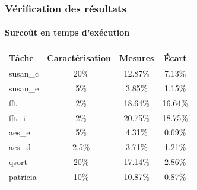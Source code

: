 
\begin{frame}
\frametitle{Vérification des résultats}
\framesubtitle{Surcoût en temps d'exécution}
\begin{center}
\begin{tabular}{l|c|c||c}
Tâche & Caractérisation & Mesures & \'Ecart\\
\hline
susan\_c & ~20\% & 12.87\% & 7.13\%\\
susan\_e & ~5\%  & 3.85\%  & 1.15\%\\
fft      & ~2\%  & 18.64\% & 16.64\%\\
fft\_i   & ~2\%  & 20.75\% & 18.75\%\\
aes\_e   & ~5\%  & 4.31\%  & 0.69\%\\
aes\_d   & ~2.5\%& 3.71\%  & 1.21\%\\
qsort    & ~20\% & 17.14\% & 2.86\%\\
patricia & ~10\% & 10.87\% & 0.87\%\\
\end{tabular}
\end{center}
\end{frame}

